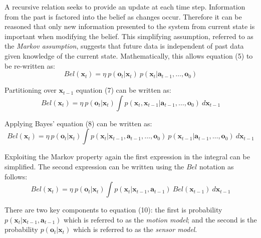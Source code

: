 \documentclass[a4paper]{article}
\begin{document}
A recursive relation seeks to provide an update at each time step. Information from the past is factored into the belief as changes occur. Therefore it can be reasoned that only new information presented to the system from current state is important when modifying the belief. This simplifying assumption, referred to as the \textit{Markov assumption}, suggests that future data is independent of past data given knowledge of the current state. Mathematically, this allows equation (5) to be re-written as:
\begin{equation}
Bel(\mathbf{x}_t) = \eta \ p(\mathbf{o}_t | \mathbf{x}_t) \ p(\mathbf{x}_t | \mathbf{a}_{t-1},\ldots,\mathbf{o}_0)
\end{equation} 

Partitioning over $\mathbf{x}_{t-1}$ equation (7) can be written as:
\begin{equation}
Bel(\mathbf{x}_t) = \eta \ p(\mathbf{o}_t | \mathbf{x}_t) \int p(\mathbf{x}_t, \mathbf{x}_{t-1} | \mathbf{a}_{t-1},\ldots,\mathbf{o}_0) \ d\mathbf{x}_{t-1}
\end{equation}

Applying Bayes' equation (8) can be written as:
\begin{equation}
Bel(\mathbf{x}_t) = \eta \ p(\mathbf{o}_t | \mathbf{x}_t) \int p(\mathbf{x}_{t} | \mathbf{x}_{t-1},\mathbf{a}_{t-1},\ldots,\mathbf{o}_0) \ p(\mathbf{x}_{t-1} | \mathbf{a}_{t-1},\ldots,\mathbf{o}_0) \ d\mathbf{x}_{t-1}
\end{equation}

Exploiting the Markov property again the first expression in the integral can be simplified. The second expression can be written using the $Bel$ notation as follows:
\begin{equation}
Bel(\mathbf{x}_t) = \eta \ p(\mathbf{o}_t | \mathbf{x}_t) \int p(\mathbf{x}_{t} | \mathbf{x}_{t-1},\mathbf{a}_{t-1}) \ Bel(\mathbf{x}_{t-1}) \ d\mathbf{x}_{t-1}
\end{equation}

There are two key components to equation (10):  the first is probability $p(\mathbf{x}_t| \mathbf{x}_{t-1}, \mathbf{a}_{t-1})$ which is referred to as the \textit{motion model}; and the second is the probability $p(\mathbf{o}_t|\mathbf{x}_t)$ which is referred to as the \textit{sensor model}.
\end{document}
